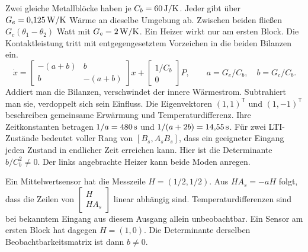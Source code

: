 Zwei gleiche Metallblöcke haben je \(C_b=60\,\mathrm{J/K}\). Jeder gibt über \(G_e=0{,}125\,\mathrm{W/K}\) Wärme an dieselbe Umgebung ab. Zwischen beiden fließen \(G_c(\theta_1-\theta_2)\) Watt mit \(G_c=2\,\mathrm{W/K}\). Ein Heizer wirkt nur am ersten Block. Die Kontaktleistung tritt mit entgegengesetztem Vorzeichen in die beiden Bilanzen ein.
\[
 \dot x=\begin{bmatrix}-(a+b)&b\\ b&-(a+b)\end{bmatrix}x+
 \begin{bmatrix}1/C_b\\0\end{bmatrix}P,\qquad
 a=G_e/C_b,\quad b=G_c/C_b .
\]
Addiert man die Bilanzen, verschwindet der innere Wärmestrom. Subtrahiert man sie, verdoppelt sich sein Einfluss. Die Eigenvektoren \((1,1)^\mathsf T\) und \((1,-1)^\mathsf T\) beschreiben gemeinsame Erwärmung und Temperaturdifferenz. Ihre Zeitkonstanten betragen \(1/a=480\,\mathrm{s}\) und \(1/(a+2b)=14{,}55\,\mathrm{s}\).
Für zwei LTI-Zustände bedeutet voller Rang von \([B_s,A_sB_s]\), dass ein geeigneter Eingang jeden Zustand in endlicher Zeit erreichen kann. Hier ist die Determinante \(b/C_b^2\ne0\). Der links angebrachte Heizer kann beide Moden anregen.

Ein Mittelwertsensor hat die Messzeile \(H=(1/2,1/2)\). Aus \(HA_s=-aH\) folgt, dass die Zeilen von \(\left[\begin{smallmatrix}H\\HA_s\end{smallmatrix}\right]\) linear abhängig sind. Temperaturdifferenzen sind bei bekanntem Eingang aus diesem Ausgang allein unbeobachtbar. Ein Sensor am ersten Block hat dagegen \(H=(1,0)\). Die Determinante derselben Beobachtbarkeitsmatrix ist dann \(b\ne0\).

